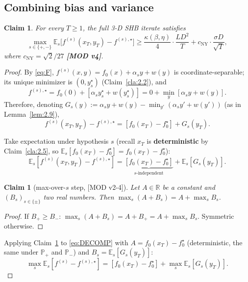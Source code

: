 \documentclass[11pt,a4paper]{article}
\theoremstyle{plain}
\newtheorem{claim}[theorem]{Claim}
\theoremstyle{definition}
\theoremstyle{remark}
\newcommand{\R}{\mathbb{R}}
\newcommand{\E}{\mathbb{E}}
\newcommand{\Prb}{\mathbb{P}}
\begin{document}
\subsection{Combining bias and variance}

\begin{claim}
\label{cla:2.10}
For every $T \geq 1$, the full 3-D SHB iterate satisfies
\[
\max_{s \in \{+, -\}} \E_s\big[f^{(s)}(x_T, y_T) - f^{(s),\star}\big] \geq \frac{\kappa(\beta,\eta)}{4}\cdot \frac{L D^2}{T} + c_\mathrm{NY}\cdot \frac{\sigma D}{\sqrt T},
\]
where $c_\mathrm{NY} = \sqrt 2/27$ \textbf{[MOD v4]}.
\end{claim}

\begin{proof}
By \eqref{eq:F}, $f^{(s)}(x,y) = f_0(x) + \alpha_s y + w(y)$ is coordinate-separable; its unique minimizer is $(0, y^\star_s)$ (Claim~\ref{cla:2.2}), and
\[
f^{(s),\star} = f_0(0) + [\alpha_s y^\star_s + w(y^\star_s)] = 0 + \min_y[\alpha_s y + w(y)].
\]
Therefore, denoting $G_s(y) := \alpha_s y + w(y) - \min_{y'}(\alpha_s y' + w(y'))$ (as in Lemma~\ref{lem:2.9}),
\[
f^{(s)}(x_T, y_T) - f^{(s),\star} = [f_0(x_T) - f_0^\star] + G_s(y_T).
\]

Take expectation under hypothesis $s$ (recall $x_T$ is \textbf{deterministic} by Claim~\ref{cla:2.5}, so $\E_s[f_0(x_T) - f_0^\star] = f_0(x_T) - f_0^\star$):
\begin{equation}
\E_s[f^{(s)}(x_T, y_T) - f^{(s),\star}] = \underbrace{[f_0(x_T) - f_0^\star]}_{\text{$s$-independent}} + \E_s[G_s(y_T)]. \tag{DECOMP}\label{eq:DECOMP}
\end{equation}

\begin{claim}[max-over-$s$ step, {[MOD v2-4]}]
\label{cla:2.11}
Let $A \in \R$ be a constant and $(B_s)_{s \in \{\pm\}}$ two real numbers. Then $\max_s (A + B_s) = A + \max_s B_s$.
\end{claim}

\begin{proof}
If $B_+ \geq B_-$: $\max_s(A + B_s) = A + B_+ = A + \max_s B_s$. Symmetric otherwise.
\end{proof}

Applying Claim~\ref{cla:2.11} to \eqref{eq:DECOMP} with $A = f_0(x_T) - f_0^\star$ (deterministic, the same under $\Prb_+$ and $\Prb_-$) and $B_s = \E_s[G_s(y_T)]$:
\begin{equation}
\max_s \E_s[f^{(s)} - f^{(s),\star}] = [f_0(x_T) - f_0^\star] + \max_s \E_s[G_s(y_T)]. \tag{MAX}\label{eq:MAX}
\end{equation}


\end{proof}
\end{document}
